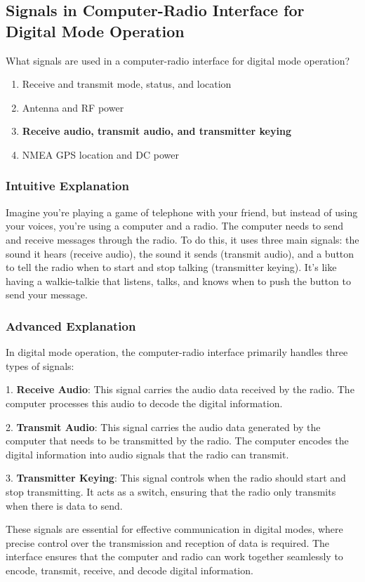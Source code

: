 \subsection{Signals in Computer-Radio Interface for Digital Mode Operation}
\label{T4A06}

\begin{tcolorbox}[colback=gray!10!white,colframe=black!75!black,title=T4A06]
What signals are used in a computer-radio interface for digital mode operation?
\begin{enumerate}[label=\Alph*]
    \item Receive and transmit mode, status, and location
    \item Antenna and RF power
    \item \textbf{Receive audio, transmit audio, and transmitter keying}
    \item NMEA GPS location and DC power
\end{enumerate}
\end{tcolorbox}

\subsubsection{Intuitive Explanation}
Imagine you're playing a game of telephone with your friend, but instead of using your voices, you're using a computer and a radio. The computer needs to send and receive messages through the radio. To do this, it uses three main signals: the sound it hears (receive audio), the sound it sends (transmit audio), and a button to tell the radio when to start and stop talking (transmitter keying). It's like having a walkie-talkie that listens, talks, and knows when to push the button to send your message.

\subsubsection{Advanced Explanation}
In digital mode operation, the computer-radio interface primarily handles three types of signals:

1. \textbf{Receive Audio}: This signal carries the audio data received by the radio. The computer processes this audio to decode the digital information.

2. \textbf{Transmit Audio}: This signal carries the audio data generated by the computer that needs to be transmitted by the radio. The computer encodes the digital information into audio signals that the radio can transmit.

3. \textbf{Transmitter Keying}: This signal controls when the radio should start and stop transmitting. It acts as a switch, ensuring that the radio only transmits when there is data to send.

These signals are essential for effective communication in digital modes, where precise control over the transmission and reception of data is required. The interface ensures that the computer and radio can work together seamlessly to encode, transmit, receive, and decode digital information.

